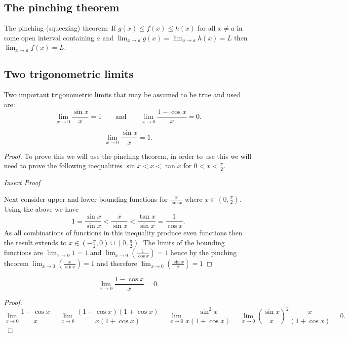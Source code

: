 \documentclass[10pt, a4paper]{article}
\begin{document}
\subsection{The pinching theorem}
The pinching (squeezing) theorem: If $g(x) \leq f(x) \leq h(x)$ for all $x \neq a$ in some open interval containing $a$ and $\lim_{x \rightarrow a}g(x) = \lim_{x \rightarrow a}h(x) = L$ then $\lim_{x \rightarrow a}f(x) = L$.

\subsection{Two trigonometric limits}
Two important trigonometric limits that may be assumed to be true and used are:
\[
\lim_{x \rightarrow 0}\frac{\sin x}{x} = 1\qquad\text{and}\qquad\lim_{x \rightarrow 0}\frac{1 - \cos x}{x} = 0.
\]

\begin{example}
    \[
    \lim_{x \rightarrow 0}\frac{\sin x}{x} = 1.
    \]
    \begin{proof}
        To prove this we will use the pinching theorem, in order to use this we will need to prove the following inequalities $\sin x < x < \tan x$ for $0 < x < \frac{\pi}{2}$.

        \textit{Insert Proof}

        Next consider upper and lower bounding functions for $\frac{x}{\sin x}$ where $x \in (0, \frac{\pi}{2})$. Using the above we have
        \[
        1 =  \frac{\sin x}{\sin x} < \frac{x}{\sin x} < \frac{\tan x}{\sin x} = \frac{1}{\cos x}.
        \]
        As all combinations of functions in this inequality produce even functions then the result extends to $x \in (-\frac{\pi}{2}, 0) \cup (0, \frac{\pi}{2})$. The limits of the bounding functions are $\lim_{x \rightarrow 0}1 = 1$ and $\lim_{x \rightarrow 0}\left(\frac{1}{\cos x}\right) = 1$ hence by the pinching theorem $\lim_{x \rightarrow 0}\left(\frac{x}{\sin x}\right) = 1$ and therefore $\lim_{x \rightarrow 0}\left(\frac{\sin x}{x}\right) = 1$
    \end{proof}
\end{example}

\begin{example}
    \[
    \lim_{x \rightarrow 0}\frac{1 - \cos x}{x} = 0.
    \]
    \begin{proof}
        \[
        \lim_{x \rightarrow 0}\frac{1 - \cos x}{x} = \lim_{x \rightarrow 0}\frac{(1 - \cos x)(1 + \cos x)}{x(1 + \cos x)} = \lim_{x \rightarrow 0}\frac{\sin ^ 2 x}{x(1 + \cos x)} = \lim_{x \rightarrow 0}\left(\frac{\sin x}{x}\right) ^ 2 \frac{x}{(1 + \cos x)} = 0.
        \]
    \end{proof}
\end{example}
\end{document}
